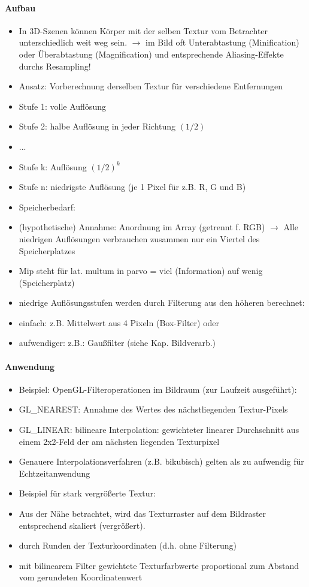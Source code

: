 \documentclass[10pt,landscape]{article}
\begin{document}
\begin{multicols}{3}
\paragraph{Aufbau}
\begin{itemize}
  \item In 3D-Szenen können Körper mit der selben Textur vom Betrachter unterschiedlich weit weg sein. $\rightarrow$ im Bild oft Unterabtastung (Minification) oder Überabtastung (Magnification) und entsprechende Aliasing-Effekte durchs Resampling!
  \item Ansatz: Vorberechnung derselben Textur für verschiedene Entfernungen
  \item Stufe 1: volle Auflösung
  \item Stufe 2: halbe Auflösung in jeder Richtung $(1/2)$
  \item ...
  \item Stufe k: Auflösung $(1/2)^k$
  \item Stufe n: niedrigste Auflösung (je 1 Pixel für z.B. R, G und B)
  \item Speicherbedarf:
  \item (hypothetische) Annahme: Anordnung im Array (getrennt f. RGB) $\rightarrow$ Alle niedrigen Auflösungen verbrauchen zusammen nur ein Viertel des Speicherplatzes
  \item Mip steht für lat. multum in parvo = viel (Information) auf wenig (Speicherplatz)
  \item niedrige Auflösungsstufen werden durch Filterung aus den höheren berechnet:
  \item einfach: z.B. Mittelwert aus 4 Pixeln (Box-Filter) oder
  \item aufwendiger: z.B.: Gaußfilter (siehe Kap. Bildverarb.)
\end{itemize}

\paragraph{Anwendung}
\begin{itemize}
  \item Beispiel: OpenGL-Filteroperationen im Bildraum (zur Laufzeit ausgeführt):
  \item GL\_NEAREST: Annahme des Wertes des nächstliegenden Textur-Pixels
  \item GL\_LINEAR: bilineare Interpolation: gewichteter linearer Durchschnitt aus einem 2x2-Feld der am nächsten liegenden Texturpixel
  \item Genauere Interpolationsverfahren (z.B. bikubisch) gelten als zu aufwendig für Echtzeitanwendung
  \item Beispiel für stark vergrößerte Textur:
  \item Aus der Nähe betrachtet, wird das Texturraster auf dem Bildraster entsprechend skaliert (vergrößert).
  \item durch Runden der Texturkoordinaten (d.h. ohne Filterung)
  \item mit bilinearem Filter gewichtete Texturfarbwerte proportional zum Abstand vom gerundeten Koordinatenwert
\end{itemize}


\end{multicols}
\end{document}
